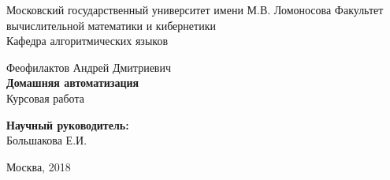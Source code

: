 \documentclass[12pt,a4paper]{article}
\begin{document}
    \begin{titlepage}
        \begin{center}
            Московский государственный университет имени М.В. Ломоносова
            Факультет вычислительной математики и кибернетики \\
            Кафедра алгоритмических языков
            \vfill


            Феофилактов Андрей Дмитриевич \\[\bigskipamount]
            \textbf{\Large Домашняя автоматизация} \\[\bigskipamount]
            Курсовая работа

            \begin{flushright}
                \textbf{Научный руководитель:} \\
                Большакова Е.И.
            \end{flushright}

            \vfill

            Москва, 2018
        \end{center}
    \end{titlepage}
    \pagebreak
    \tableofcontents
    \thispagestyle{empty}
    

    
    
    
    
    
    
    

    
\end{document}
